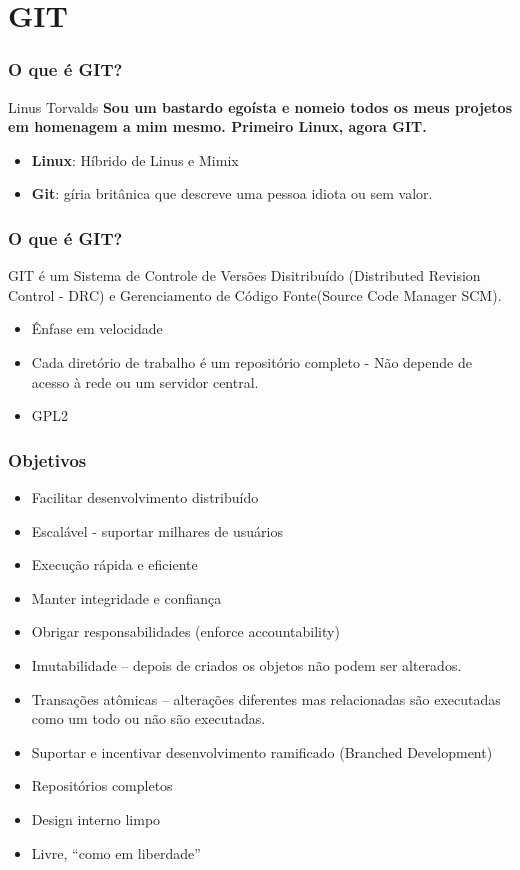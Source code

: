 \section{GIT}

\begin{frame}
\frametitle{O que é GIT?}

\begin{block}{Linus Torvalds}
\textbf{Sou um bastardo egoísta e nomeio todos os meus projetos em homenagem a mim mesmo. Primeiro Linux, agora GIT.}
\end{block}

\begin{itemize}
\item \textbf{Linux}: Híbrido de Linus e Mimix
\item \textbf{Git}: gíria britânica que descreve uma pessoa idiota ou sem valor.
\end{itemize}

\end{frame}

\begin{frame}
\frametitle{O que é GIT?}
GIT é um Sistema de Controle de Versões Disitribuído (Distributed Revision Control - DRC) e Gerenciamento de Código Fonte(Source Code Manager SCM).
\begin{itemize}
\item Ênfase em velocidade
\item Cada diretório de trabalho é um repositório completo - Não depende de acesso à rede ou um servidor central.
\item GPL2
\end{itemize}
\end{frame}


\begin{frame}
\frametitle{Objetivos}

\begin{itemize}
\item Facilitar desenvolvimento distribuído
\item Escalável - suportar milhares de usuários
\item Execução rápida e eficiente
\item Manter integridade e confiança
\item Obrigar responsabilidades (enforce accountability)
\item Imutabilidade – depois de criados os objetos não podem ser alterados.
\item Transações atômicas – alterações diferentes mas relacionadas são executadas como um todo ou não são executadas.
\item Suportar e incentivar desenvolvimento ramificado (Branched Development)
\item Repositórios completos
\item Design interno limpo
\item Livre, “como em liberdade”
\end{itemize}

\end{frame}

